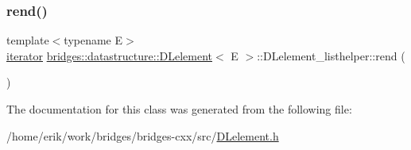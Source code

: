 \subsubsection{\texorpdfstring{rend()}{rend()}}
{\footnotesize\ttfamily template$<$typename E$>$ \\
\hyperlink{classbridges_1_1datastructure_1_1_d_lelement_1_1_d_lelement__listhelper_1_1iterator}{iterator} \hyperlink{classbridges_1_1datastructure_1_1_d_lelement}{bridges\+::datastructure\+::\+D\+Lelement}$<$ E $>$\+::D\+Lelement\+\_\+listhelper\+::rend (\begin{DoxyParamCaption}{ }\end{DoxyParamCaption})\hspace{0.3cm}{\ttfamily [inline]}}



The documentation for this class was generated from the following file\+:\begin{DoxyCompactItemize}
\item 
/home/erik/work/bridges/bridges-\/cxx/src/\hyperlink{_d_lelement_8h}{D\+Lelement.\+h}\end{DoxyCompactItemize}
